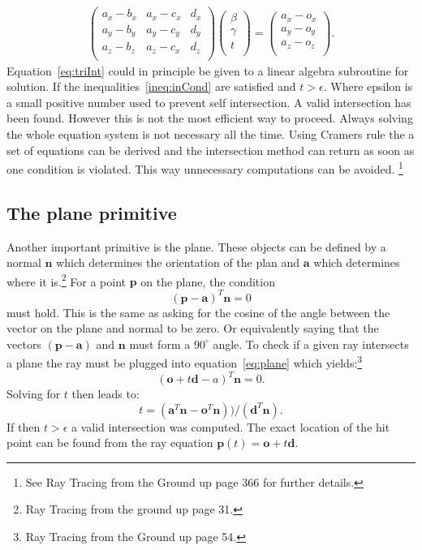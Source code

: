 \begin{align}
\begin{pmatrix}
a_x - b_x & a_x - c_x & d_x \\
a_y - b_y & a_y - c_y & d_y \\
a_z - b_z & a_z - c_x & d_z \\
\end{pmatrix}
\begin{pmatrix}
\beta \\ \gamma \\ t \\
\end{pmatrix}
= 
\begin{pmatrix}
a_x - o_x \\
a_y - o_y \\
a_z - o_z \\
\end{pmatrix}.
\label{eq:triInt}
\end{align}
Equation~\ref{eq:triInt} could in principle be given to a linear algebra subroutine for solution. If the inequalities~\ref{ineq:inCond} are satisfied and $t > \epsilon$. Where epsilon is a small positive number used to prevent self intersection. A valid intersection has been found. However this
is not the most efficient way to proceed. Always solving the whole equation system is not necessary all the time.
Using Cramers rule the a set of equations can be derived and the intersection method can return as soon as one 
condition is violated. This way unnecessary computations can be avoided. \footnote{See Ray Tracing from the Ground up page 366 for further details.}

\subsection{The plane primitive}
Another important primitive is the plane. These objects can be defined by a normal $\mathbf{n}$ which determines the orientation of the plan and $\mathbf{a}$ which determines where it is.\footnote{Ray Tracing from the ground up page 31.} 
For a point $\mathbf{p}$ on the plane, the condition 
\begin{equation}
(\mathbf{p} - \mathbf{a})^T  \mathbf{n} = 0
\label{eq:plane}
\end{equation} 
must hold. This is the same as asking for the cosine of the angle between the vector on the plane and normal to be zero. Or equivalently saying that the vectors $(\mathbf{p} - \mathbf{a})$ and $\mathbf{n}$ must form a $90^{\circ}$ angle. To check if a given ray intersects a plane the ray must be plugged into equation~\ref{eq:plane} which yields:\footnote{Ray Tracing from the Ground up page 54.}
\begin{equation}
(\mathbf{o} + t\mathbf{d} - a)^T \mathbf{n} = 0.
\end{equation}
Solving for $t$ then leads to:
\begin{equation}
t = (\mathbf{a}^T\mathbf{n} -  \mathbf{o}^T\mathbf{n}) ) / (\mathbf{d}^T \mathbf{n}).
\end{equation}
If then $ t > \epsilon$ a valid intersection was computed. The exact location of the hit point can be found from the ray equation $\mathbf{p}(t) = \mathbf{o} + t\mathbf{d}$. 

